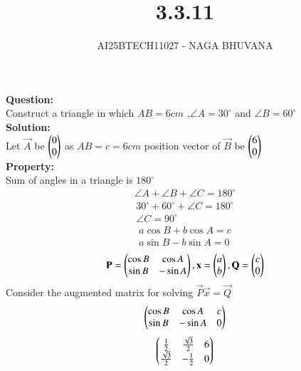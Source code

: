 \documentclass[journal,12pt,onecolumn]{IEEEtran}
\begin{document}
\title{3.3.11}
\author{AI25BTECH11027 - NAGA BHUVANA}
{\let\newpage\relax\maketitle}
\noindent
		\textbf{Question:}\\
Construct a triangle in which $AB=6cm$ ,$\angle A=30^\circ$ and $\angle B=60^\circ$\\
\textbf{Solution:}\\
Let $\vec{A}$ be $\begin{pmatrix}0\\0\end{pmatrix}$ as $AB=c=6 cm$ position vector of $\vec{B}$ be $\begin{pmatrix}6\\0\end{pmatrix}$\\
\textbf{Property:}\\
Sum of angles in a triangle is $180^\circ$\\
\begin{align}
    \angle A+\angle B+\angle C=180^\circ
\end{align}
\begin{align}
    30^\circ+60^\circ+\angle C=180^\circ\\
    \angle C=90^\circ
\end{align}
\begin{align}
a \cos B+b \cos A=c\\
a \sin B-b \sin A=0
\end{align}
\begin{align}
	\mathbf{P}=\begin{pmatrix}\cos B & \cos A \\ \sin B & -\sin A\end{pmatrix},\mathbf{x}=\begin{pmatrix}a\\b\end{pmatrix},\mathbf{Q}=\begin{pmatrix}c\\0\end{pmatrix}
\end{align}
Consider the augmented matrix for solving $\vec{P}\vec{x}=\vec{Q}$
\begin{align}
	\begin{pmatrix}\cos B&\cos A & c\\ \sin B&-\sin A&0\end{pmatrix}
\end{align}
       \begin{align}
	       \begin{pmatrix}\frac{1}{2} & \frac{\sqrt{3}}{2}&6\\ \frac{\sqrt{3}}{2}& -\frac{1}{2}&0\end{pmatrix}
\end{align}
\end{document}
